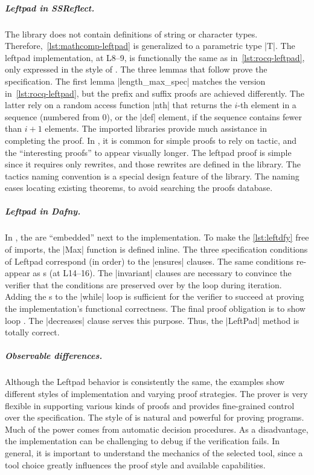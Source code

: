 \subparagraph*{Leftpad in SSReflect.}
The  library does not contain definitions of string
or character types. Therefore,~\autoref{lst:mathcomp-leftpad} is generalized to
a parametric type \pr|T|. The leftpad implementation, at L8--9, is functionally
the same as in~\autoref{lst:rocq-leftpad}, only expressed in the style of
. The three lemmas that follow prove the specification. The first
lemma \pr|length_max_spec| matches the  version
in~\autoref{lst:rocq-leftpad}, but the prefix and suffix proofs are achieved
differently. The latter rely on a random access function \pr|nth| that returns
the \(i\)-th element in a sequence (numbered from 0), or the \pr|def| element,
if the sequence contains fewer than \(i+1\) elements. The imported libraries
provide much assistance in completing the proof. In , it is
common for simple proofs to rely on  tactic, and the
\enquote{interesting proofs} to appear visually longer. The leftpad proof is
simple since it requires only rewrites, and those rewrites are defined in the
library. The tactics naming convention is a special design feature of the
 library. The naming eases locating existing
theorems, to avoid searching the proofs database.

\subparagraph*{Leftpad in Dafny.}
In , the  are \enquote{embedded} next to the
implementation. To make the \autoref{lst:leftdfy} free of imports, the \pr|Max|
function is defined inline. The three specification conditions of Leftpad
correspond (in order) to the \pr|ensures| clauses. The same conditions re-appear
as s (at L14--16). The \pr|invariant| clauses are necessary
to convince the verifier that the conditions are preserved over by the loop
during iteration. Adding the s to the \pr|while| loop is
sufficient for the verifier to succeed at proving the implementation's
functional correctness. The final proof obligation is to show loop
. The \pr|decreases| clause serves this purpose. Thus, the
\pr|LeftPad| method is totally correct.

\subparagraph*{Observable differences.}
Although the Leftpad behavior is consistently the same, the examples show
different styles of implementation and varying proof strategies. The 
prover is very flexible in supporting various kinds of proofs and provides
fine-grained control over the specification. The
 style of  is natural and powerful for
proving programs. Much of the power comes from automatic decision procedures. As
a disadvantage, the implementation can be challenging to debug if the
verification fails. In general, it is important to understand the mechanics of
the selected tool, since a tool choice greatly influences the proof style and
available capabilities.

